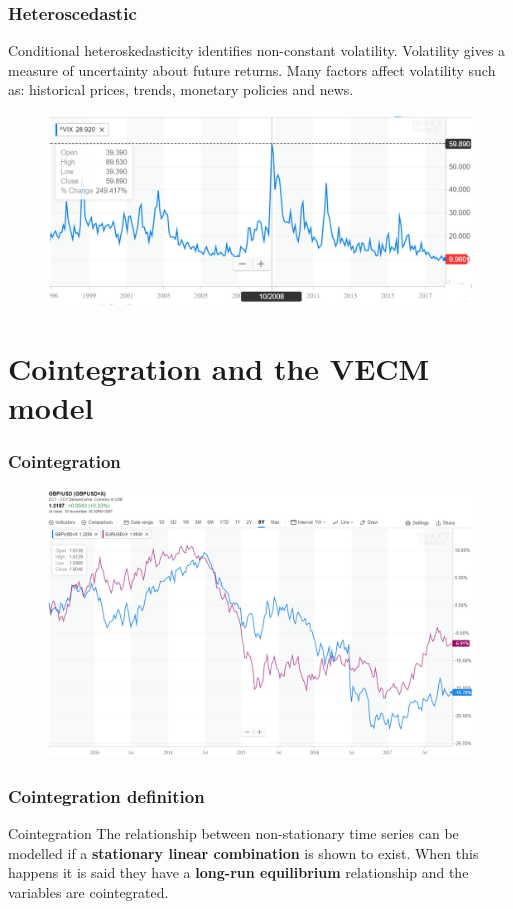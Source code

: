 \documentclass{beamer}
\begin{document}
\begin{frame}
\frametitle{Heteroscedastic}
Conditional heteroskedasticity identifies non-constant volatility.
Volatility gives a measure of uncertainty about future returns. Many factors affect volatility such as: historical prices, trends, monetary policies and news.
\begin{figure}
\includegraphics[width=0.8\paperwidth]{img/vix}
\end{figure}
\end{frame}

\section{Cointegration and the VECM model}
\begin{frame}
\frametitle{Cointegration}
\begin{figure}
\includegraphics[width=0.8\paperwidth]{img/motivation}
\end{figure}
\end{frame}

\begin{frame}
\frametitle{Cointegration definition}

\begin{block}{Cointegration}
The relationship between non-stationary time series can be modelled if a {\bf stationary linear combination} is shown to exist.
When this happens it is said they have a {\bf long-run
equilibrium} relationship and the variables are {\color{red} cointegrated}.
\end{block}


\end{frame}
\end{document}
